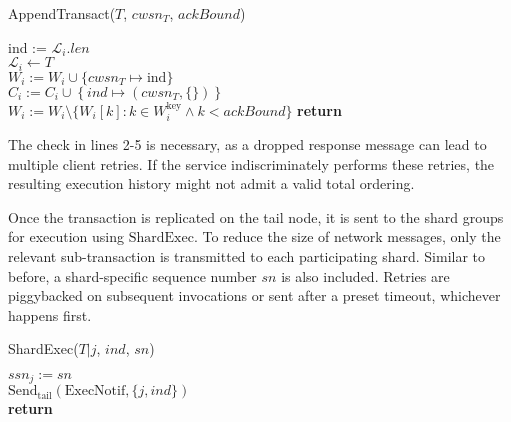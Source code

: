 \documentclass{article}
\begin{document}
\begin{procedure}[H]
  \caption{AppendTransact($T$, $cwsn_T$, $ackBound$)}
   
  ind := $\mathcal{L}_i.len$ \\
  $\mathcal{L}_i \leftarrow T$ \\
  $W_i := W_i \cup \{ cwsn_T \mapsto \text{ind}\}$ \\
  $C_i := C_i \cup \left \{ind \mapsto (cwsn_T, \{ \}) \right \}$ \\
   
  $W_i := W_i \setminus \{W_i[k] : k \in W_i^{\text{key}} \wedge k < ackBound\}$   
  \textbf{return}
\end{procedure}
\par The check in lines 2-5 is necessary, as a dropped response message can lead to multiple client retries. If the service indiscriminately performs these retries, the resulting execution history might not admit a valid total ordering. 
\par Once the transaction is replicated on the tail node, it is sent to the shard groups for execution using $\text{ShardExec}$. To reduce the size of network messages, only the relevant sub-transaction is transmitted to each participating shard. Similar to before, a shard-specific sequence number $sn$ is also included. Retries are piggybacked on subsequent invocations or sent after a preset timeout, whichever happens first. \\
\begin{procedure}[H]
  \caption{ShardExec($T|j$, $ind$, $sn$)}
   
  $ssn_j := sn$ \\
  $\text{Send}_{\text{tail}}(\text{ExecNotif}, \{j, ind\})$\\
  \textbf{return}
\end{procedure}
\end{document}
